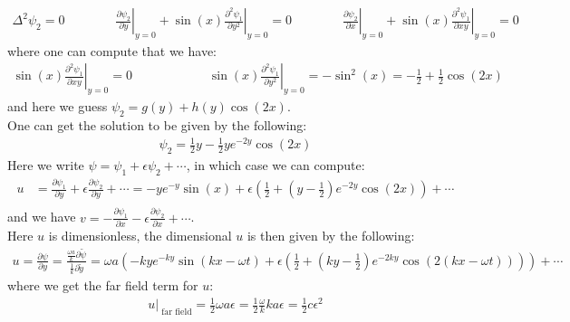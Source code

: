 \documentclass[11pt]{book}
\theoremstyle{break}
\theoremstyle{break}
\newcommand{\pd}{\partial}
\newcommand{\that}[1]{\widetilde{#1}}
\begin{document}
\begin{align*}
\Delta^2 \psi_2=0\qquad\qquad  \left.\frac{\pd \psi_2}{\pd y}\right|_{y=0} + \sin(x) \left.\frac{\pd^2 \psi_1}{\pd y^2}\right|_{y=0} = 0 \qquad\qquad \left.\frac{\pd \psi_2}{\pd x}\right|_{y=0} + \sin(x) \left.\frac{\pd^2 \psi_1}{\pd xy}\right|_{y=0} = 0 
\end{align*}
where one can compute that we have:
\begin{align*}
 \sin(x) \left.\frac{\pd^2 \psi_1}{\pd xy}\right|_{y=0}  = 0 \qquad\qquad\qquad \sin(x) \left.\frac{\pd^2 \psi_1}{\pd y^2}\right|_{y=0} = -\sin^2(x) = -\frac{1}{2}+ \frac{1}{2}\cos(2x)
\end{align*}
and here we guess $\psi_2 = g(y) + h(y) \cos(2x)$. \\
One can get the solution to be given by the following:
\begin{align*}
\psi_2 = \frac{1}{2}y - \frac{1}{2}y e^{-2y}\cos(2x)
\end{align*}
Here we write $\psi = \psi_1 + \epsilon \psi_2 + \cdots$, in which case we can compute:
\begin{align*}
u &= \frac{\pd \psi_1}{\pd y}+ \epsilon \frac{\pd \psi_2}{\pd y}+\cdots = -y e^{-y}\sin(x) + \epsilon \left( \frac{1}{2}+ \left( y - \frac{1}{2}\right) e^{-2y}\cos(2x) \right) + \cdots\\
\end{align*}
and we have $v = - \frac{\pd \psi_1}{\pd x} - \epsilon \frac{\pd \psi_2}{\pd x}+ \cdots$.\\
Here $u$ is dimensionless, the dimensional $u$ is then given by the following:
\begin{align*}
u = \frac{\pd \psi}{\pd y} = \frac{\frac{\omega a}{k} \pd \that{\psi}}{\frac{1}{k}\pd \that{y}} = \omega a\left(-ky e^{-ky}\sin(kx-\omega t) + \epsilon \left( \frac{1}{2}+ \left(ky-\frac{1}{2}\right)e^{-2ky}\cos(2(kx-\omega t))\right) \right) + \cdots
\end{align*}
where we get the far field term for $u$:
\begin{align*}
u|_{\text{ far field}} = \frac{1}{2}\omega a \epsilon = \frac{1}{2}\frac{\omega}{k}ka \epsilon = \frac{1}{2}c\epsilon^2
\end{align*}
\newpage
\end{document}

